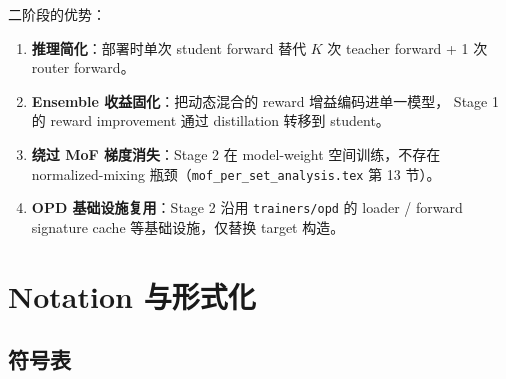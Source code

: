 \documentclass[11pt,a4paper]{article}
\theoremstyle{definition}
\begin{document}
二阶段的优势：

\begin{enumerate}[leftmargin=1.5em]
\item \textbf{推理简化}：部署时单次 student forward 替代 $K$ 次 teacher
  forward + 1 次 router forward。
\item \textbf{Ensemble 收益固化}：把动态混合的 reward 增益编码进单一模型，
  Stage 1 的 reward improvement 通过 distillation 转移到 student。
\item \textbf{绕过 MoF 梯度消失}：Stage 2 在 model-weight 空间训练，不存在
  normalized-mixing 瓶颈（\texttt{mof\_per\_set\_analysis.tex} 第 13 节）。
\item \textbf{OPD 基础设施复用}：Stage 2 沿用 \texttt{trainers/opd} 的
  loader / forward signature cache 等基础设施，仅替换 target 构造。
\end{enumerate}

\section{Notation 与形式化}
\label{sec:notation}

\subsection{符号表}
\end{document}
